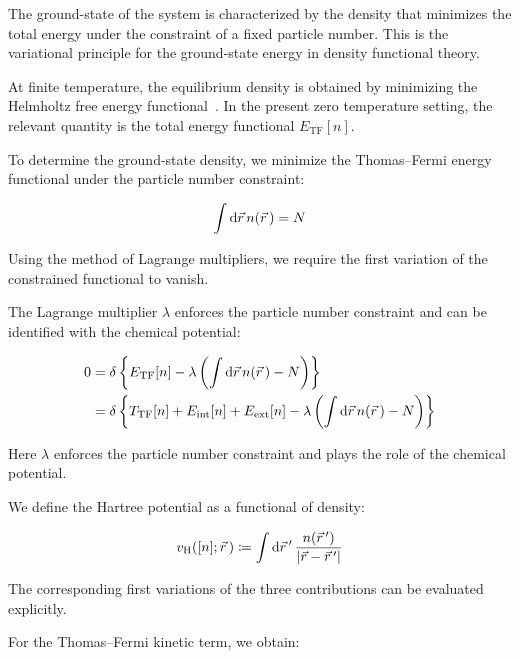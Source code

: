 The ground-state of the system is characterized by the density that minimizes the total energy under the constraint of a fixed particle number.
This is the variational principle for the ground-state energy in density functional theory.

At finite temperature, the equilibrium density is obtained by minimizing the Helmholtz free energy functional~\cite{mermin1965thermal}.
In the present zero temperature setting, the relevant quantity is the total energy functional $E_\mathrm{TF}[n]$.

To determine the ground-state density, we minimize the Thomas--Fermi energy functional under the particle number constraint:

\begin{equation}
    \int\mathrm{d}{\vec{r}}\,n(\vec{r}\,)=N
\label{constraint_particle_number}
\end{equation}

Using the method of Lagrange multipliers, we require the first variation of the constrained functional to vanish.

The Lagrange multiplier $\lambda$ enforces the particle number constraint and can be identified with the chemical potential:

\begin{equation}
\begin{aligned}
    0 &= \delta\left\{E_\mathrm{TF}[n]-\lambda\left(\int\mathrm{d}{\vec{r}}\,n(\vec{r}\,)-N\right)\right\}\\
    &= \delta\left\{T_\mathrm{TF}[n]+E_\mathrm{int}[n]+E_\mathrm{ext}[n]-\lambda\left(\int\mathrm{d}{\vec{r}}\,n(\vec{r}\,)-N\right)\right\}
\end{aligned}
\label{total_energy_variation}
\end{equation}

Here $\lambda$ enforces the particle number constraint and plays the role of the chemical potential.

We define the Hartree potential as a functional of density:

\begin{equation}
    v_\mathrm{H}([n];\vec{r}\,)\coloneqq\int\mathrm{d}{\vec{r}\,'}\,\frac{n(\vec{r}\,')}{|\vec{r}-\vec{r}\,'|}
\label{Hartree_potential_definition}
\end{equation}

The corresponding first variations of the three contributions can be evaluated explicitly.

For the Thomas--Fermi kinetic term, we obtain:

